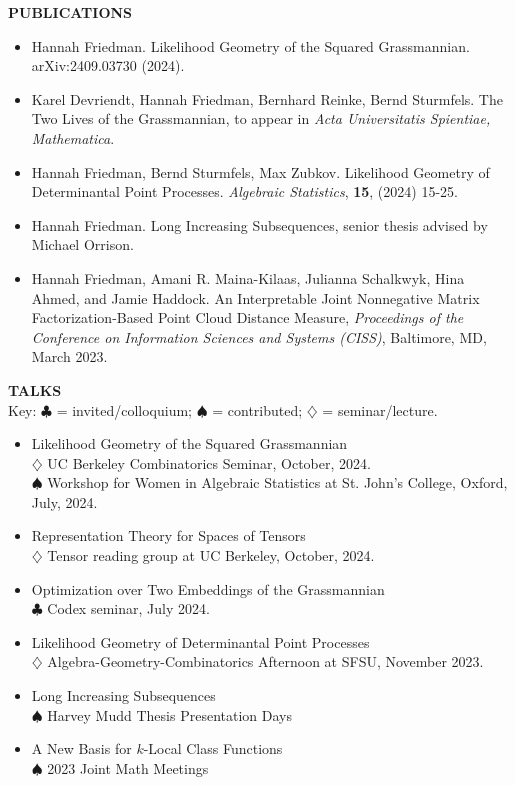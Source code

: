 \documentclass[11pt]{article}
\newcommand{\hdr}[1]{\textcolor{blue(ryb)}{\textbf{#1}}}
\begin{document}
\bigskip

\hdr{PUBLICATIONS}\\
\begin{itemize}
\item Hannah Friedman.
  Likelihood Geometry of the Squared Grassmannian. arXiv:2409.03730 (2024).
  \item Karel Devriendt, Hannah Friedman, Bernhard Reinke, Bernd Sturmfels.
    The Two Lives of the Grassmannian, to appear in \textit{Acta Universitatis Spientiae, Mathematica}. 
\item Hannah Friedman, Bernd Sturmfels, Max Zubkov.
  Likelihood Geometry of Determinantal Point Processes.
  \emph{Algebraic Statistics}, \textbf{15}, (2024) 15-25.
\item Hannah Friedman. Long Increasing Subsequences, senior thesis advised by Michael Orrison. 
\item Hannah Friedman, Amani R. Maina-Kilaas, Julianna Schalkwyk, Hina Ahmed, and Jamie Haddock. 
  An Interpretable Joint Nonnegative Matrix Factorization-Based Point Cloud Distance Measure, \emph{Proceedings of the Conference on Information Sciences and Systems (CISS)}, Baltimore, MD, March 2023.
\end{itemize}

\bigskip

\hdr{TALKS}\\
Key: $\clubsuit$ = invited/colloquium; $\spadesuit$ = contributed; $\diamondsuit$ = seminar/lecture.
\begin{itemize}
\item Likelihood Geometry of the Squared Grassmannian\\
  $\diamondsuit$ UC Berkeley Combinatorics Seminar, October, 2024.\\
  $\spadesuit$ Workshop for Women in Algebraic Statistics at St. John's College, Oxford, July, 2024. 
\item Representation Theory for Spaces of Tensors\\
  $\diamondsuit$ Tensor reading group at UC Berkeley, October, 2024. 
\item Optimization over Two Embeddings of the Grassmannian\\
  $\clubsuit$ Codex seminar, July 2024. 
\item Likelihood Geometry of Determinantal Point Processes\\
  $\diamondsuit$ Algebra-Geometry-Combinatorics Afternoon at SFSU, November 2023.
\item Long Increasing Subsequences\\
  $\spadesuit$ Harvey Mudd Thesis Presentation Days
\item A New Basis for $k$-Local Class Functions\\
  $\spadesuit$ 2023 Joint Math Meetings
\end{itemize}
\end{document}
